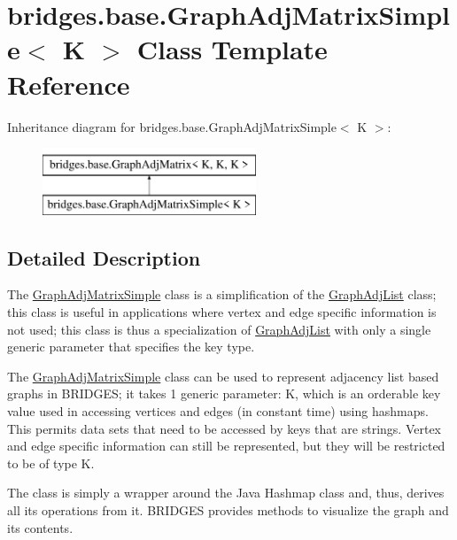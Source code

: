 \hypertarget{classbridges_1_1base_1_1_graph_adj_matrix_simple}{}\section{bridges.\+base.\+Graph\+Adj\+Matrix\+Simple$<$ K $>$ Class Template Reference}
\label{classbridges_1_1base_1_1_graph_adj_matrix_simple}
Inheritance diagram for bridges.\+base.\+Graph\+Adj\+Matrix\+Simple$<$ K $>$\+:\begin{figure}[H]
\begin{center}
\leavevmode
\includegraphics[height=2.000000cm]{classbridges_1_1base_1_1_graph_adj_matrix_simple}
\end{center}
\end{figure}


\subsection{Detailed Description}
The \mbox{\hyperlink{classbridges_1_1base_1_1_graph_adj_matrix_simple}{Graph\+Adj\+Matrix\+Simple}} class is a simplification of the \mbox{\hyperlink{classbridges_1_1base_1_1_graph_adj_list}{Graph\+Adj\+List}} class; this class is useful in applications where vertex and edge specific information is not used; this class is thus a specialization of \mbox{\hyperlink{classbridges_1_1base_1_1_graph_adj_list}{Graph\+Adj\+List}} with only a single generic parameter that specifies the key type. 

The \mbox{\hyperlink{classbridges_1_1base_1_1_graph_adj_matrix_simple}{Graph\+Adj\+Matrix\+Simple}} class can be used to represent adjacency list based graphs in B\+R\+I\+D\+G\+ES; it takes 1 generic parameter\+: K, which is an orderable key value used in accessing vertices and edges (in constant time) using hashmaps. This permits data sets that need to be accessed by keys that are strings. Vertex and edge specific information can still be represented, but they will be restricted to be of type K.

The class is simply a wrapper around the Java Hashmap class and, thus, derives all its operations from it. B\+R\+I\+D\+G\+ES provides methods to visualize the graph and its contents.

